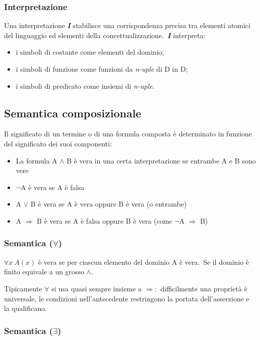\subsubsection{Interpretazione}

Una interpretazione \textbf{\textit{I}} stabilisce una corrispondenza precisa tra elementi atomici del linguaggio ed elementi della concettualizzazione.\
\textbf{\textit{I}} interpreta:
\begin{itemize}
	\item i simboli di costante come elementi del dominio;
	\item i simboli di funzione come funzioni da \textit{n-uple} di D in D;
	\item i simboli di predicato come insiemi di \textit{n-uple}.
\end{itemize}

\subsection{Semantica composizionale}

Il significato di un termine o di una formula composta è determinato in funzione del significato dei suoi componenti:
\begin{itemize}
	\item La formula A $\land$ B è vera in una certa interpretazione se entrambe A e B sono vere
	\item $\lnot$A è vera se A è falsa
	\item A $\lor$ B è vera se A è vera oppure B è vera (o entrambe)
	\item A $\Rightarrow$ B è vera se A è falsa oppure B è vera (come $\lnot$A $\Rightarrow$ B)
\end{itemize}

\subsubsection{Semantica ($\forall$)}

$\forall x\ A(x)$ è vera se per ciascun elemento del dominio A è vera.\
Se il dominio è finito equivale a un grosso $\land$.

Tipicamente $\forall$ si usa quasi sempre insieme a $\Rightarrow$:\ difficilmente una proprietà è universale, le condizioni nell'antecedente restringono la portata dell'asserzione e la qualificano.

\subsubsection{Semantica ($\exists$)}

